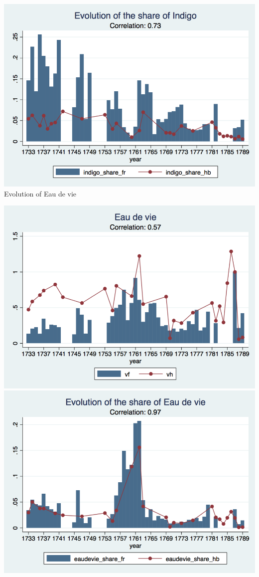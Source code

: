 \documentclass[12pt,a4paper,titlepage]{article}
\begin{document}
\includegraphics[scale=.28]{indigo_share_long.png}\\
\caption{Evolution of Eau de vie}
\includegraphics[scale=.28]{eaudevie_long.png}
\includegraphics[scale=.28]{eaudevie_share_long.png}\\
\end{document}
